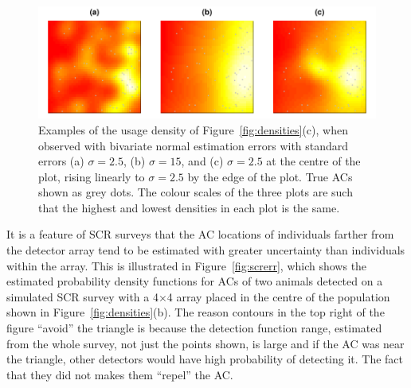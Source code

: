 \documentclass[10pt,a4paper]{article}
\begin{document}
\begin{figure}[htbp]
\centering
\includegraphics[width=\textwidth]{acuseesterr.pdf}
\caption{Examples of the usage density of Figure~\ref{fig:densities}(c), when observed with bivariate normal estimation errors with standard errors (a) $\sigma=2.5$, (b) $\sigma=15$, and (c) $\sigma=2.5$ at the centre of the plot, rising linearly to $\sigma=2.5$ by the edge of the plot. True ACs shown as grey dots. The colour scales of the three plots are such that the highest and lowest densities in each plot is the same.}
\label{fig:acuseesterr}
\end{figure}

It is a feature of SCR surveys that the AC locations of individuals farther from the detector array tend to be estimated with greater uncertainty than individuals within the array. This is illustrated in Figure~\ref{fig:screrr}, which shows the estimated probability density functions for ACs of two animals detected on a simulated SCR survey with a 4$\times$4 array placed in the centre of the population shown in Figure~\ref{fig:densities}(b). The reason contours in the top right of the figure ``avoid'' the triangle is because the detection function range, estimated from the whole survey, not just the points shown, is large and if the AC was near the triangle, other detectors would have high probability of detecting it. The fact that they did not makes them ``repel'' the AC. %
\end{document}

